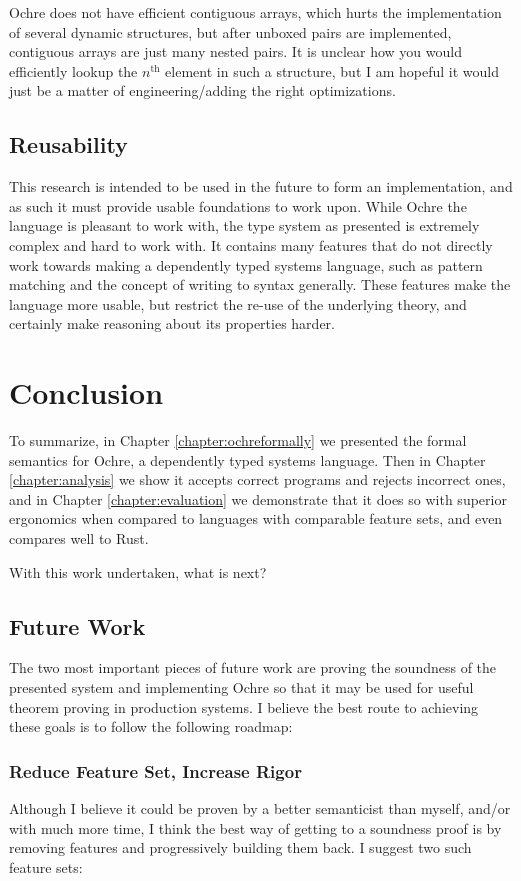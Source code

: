 \documentclass[12pt,twoside]{report}
\begin{document}
Ochre does not have efficient contiguous arrays, which hurts the implementation of several dynamic structures, but after unboxed pairs are implemented, contiguous arrays are just many nested pairs. It is unclear how you would efficiently lookup the $n^{\text{th}}$ element in such a structure, but I am hopeful it would just be a matter of engineering/adding the right optimizations.

\section{Reusability}
This research is intended to be used in the future to form an implementation, and as such it must provide usable foundations to work upon. While Ochre the language is pleasant to work with, the type system as presented is extremely complex and hard to work with. It contains many features that do not directly work towards making a dependently typed systems language, such as pattern matching and the concept of writing to syntax generally. These features make the language more usable, but restrict the re-use of the underlying theory, and certainly make reasoning about its properties harder.

\chapter{Conclusion}
\label{chapter:conclusion}
To summarize, in Chapter \ref{chapter:ochreformally} we presented the formal semantics for Ochre, a dependently typed systems language. Then in Chapter \ref{chapter:analysis} we show it accepts correct programs and rejects incorrect ones, and in Chapter \ref{chapter:evaluation} we demonstrate that it does so with superior ergonomics when compared to languages with comparable feature sets, and even compares well to Rust.

With this work undertaken, what is next?

\section{Future Work}
The two most important pieces of future work are proving the soundness of the presented system and implementing Ochre so that it may be used for useful theorem proving in production systems. I believe the best route to achieving these goals is to follow the following roadmap:

\subsection{Reduce Feature Set, Increase Rigor}
Although I believe it could be proven by a better semanticist than myself, and/or with much more time, I think the best way of getting to a soundness proof is by removing features and progressively building them back. I suggest two such feature sets:
\end{document}
